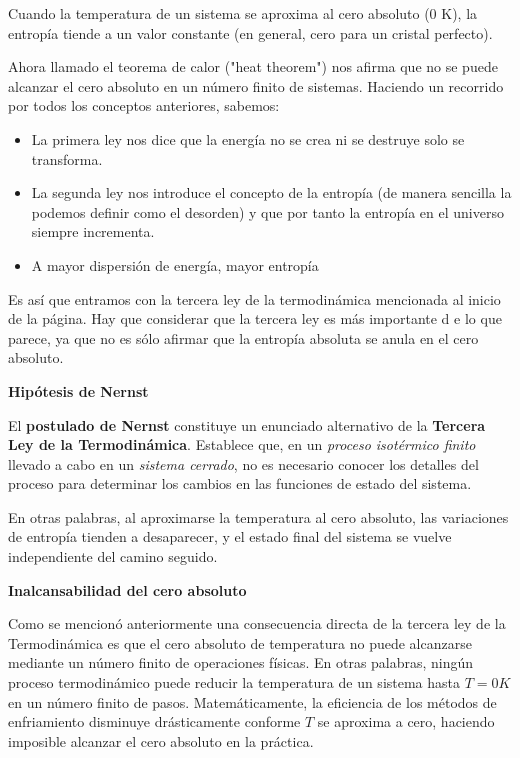 \begin{center}
Cuando la temperatura de un sistema se aproxima al cero absoluto (0 K), la entropía tiende a un valor constante (en general, cero para un cristal perfecto).
\end{center}
Ahora llamado el teorema de calor ("heat theorem") nos afirma que no se puede alcanzar el cero absoluto en un número finito de sistemas.
Haciendo un recorrido por todos los conceptos anteriores, sabemos:
\begin{itemize}
    \item La primera ley nos dice que la energía no se crea ni se destruye solo se transforma.
    \item La segunda ley nos introduce el concepto de la entropía (de manera sencilla la podemos definir como el desorden) y que por tanto la entropía en el universo siempre incrementa.
    \item A mayor dispersión de energía, mayor entropía
    
\end{itemize}
Es así que entramos con la tercera ley de la termodinámica mencionada al inicio de la página. Hay que considerar que la tercera ley es más importante d e lo que parece, ya que no es sólo afirmar que la entropía absoluta se anula en el cero absoluto.

\begin{center}
    \Large\textbf{Hipótesis de Nernst}
\end{center}

El \textbf{postulado de Nernst} constituye un enunciado alternativo de la \textbf{Tercera Ley de la Termodinámica}. 
Establece que, en un \textit{proceso isotérmico finito} llevado a cabo en un \textit{sistema cerrado}, 
no es necesario conocer los detalles del proceso para determinar los cambios en las funciones de estado del sistema. 

En otras palabras, al aproximarse la temperatura al cero absoluto, las variaciones de entropía tienden a desaparecer, 
y el estado final del sistema se vuelve independiente del camino seguido.

\begin{center}
    \textbf{Inalcansabilidad del cero absoluto}
\end{center}
Como se mencionó anteriormente una consecuencia directa de la tercera ley de la Termodinámica es que el cero absoluto de temperatura no puede alcanzarse mediante un número finito de operaciones físicas. En otras palabras, ningún proceso termodinámico puede reducir la temperatura de un sistema hasta $T=0K$ en un número finito de pasos. Matemáticamente, la eficiencia de los métodos de enfriamiento disminuye drásticamente conforme $T$ se aproxima a cero, haciendo imposible alcanzar el cero absoluto en la práctica.

